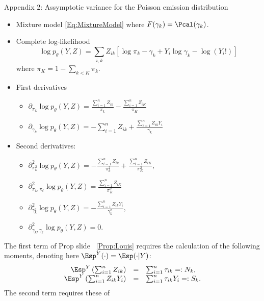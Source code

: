 \documentclass[compress,10pt]{beamer}
\begin{document}
\begin{frame}[allowframebreaks]{Appendix 2: Assymptotic variance for the Poisson emission distribution}
\label{App:AssVarPoiss}

 \begin{itemize}
  \item Mixture model \eqref{Eq:MixtureModel} where $F(\gamma_k) = \Pcal(\gamma_k)$. 
  \item Complete log-likelihood
$$
\log p_\theta(Y, Z) = \sum_{i, k} Z_{ik} \left[\log \pi_k - \gamma_k + Y_i \log \gamma_k - \log (Y_i!) \right]
$$
where $\pi_K = 1- \sum_{k < K} \pi_k$. 

\item First derivatives 
 \begin{itemize}
\item $\partial_{\pi_k} \log p_\theta(Y, Z) = \frac{\sum_{i=1}^n Z_{ik}}{\pi_k} - \frac{\sum_{i=1}^n Z_{iK}}{\pi_K}$
\item $\partial_{\gamma_k} \log p_\theta(Y, Z) = -\sum_{i=1}^n Z_{ik} + \frac{\sum_{i=1}^n Z_{ik} Y_i}{\gamma_k} 
$
\end{itemize}
\framebreak
\item Second derivatives:
\begin{itemize}
\item $
\partial^2_{\pi_k^2} \log p_\theta(Y, Z) = -\frac{\sum_{i=1}^n Z_{ik}}{\pi_k^2} + \frac{\sum_{i=1}^n Z_{iK}}{\pi_K^2}, 
$
\item $
\partial^2_{\pi_k, \pi_\ell} \log p_\theta(Y, Z) = \frac{\sum_{i=1}^n Z_{iK}}{\pi_K^2}
$
\item $
\partial^2_{\gamma_k^2} \log p_\theta(Y, Z) = -\frac{\sum_{i=1}^n Z_{ik} Y_i}{\gamma_k^2},
$
\item $\partial^2_{\gamma_k, \gamma_\ell} \log p_\theta(Y, Z) = 0.
$
\end{itemize}
\end{itemize}

The first term of Prop slide ~\ref{Prop:Louis} requires the calculation of the following moments, denoting here $\Esp^Y(\cdot) = \Esp(\cdot | Y)$:
$$
\begin{array}{rcl}
  \Esp^Y\left( \sum_{i=1}^n Z_{ik} \right) & = & \sum_{i=1}^n \tau_{ik} =: N_k, \\
  \Esp^Y\left( \sum_{i=1}^n Z_{ik} Y_i \right) & = & \sum_{i=1}^n \tau_{ik} Y_i =: S_k. \\
\end{array}
$$
The second term requires these of




\end{frame}
\end{document}
